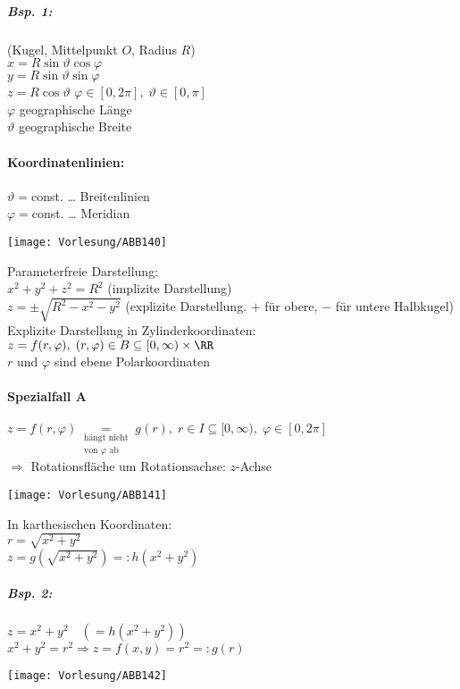 \subparagraph{Bsp. 1:} (Kugel, Mittelpunkt $O$, Radius $R$)\\
$x= R \sin \vartheta \cos \varphi$\\
$y=R \sin \vartheta \sin \varphi$\\
$z = R \cos \vartheta$ \qquad $\varphi \in [0,2\pi], \; \vartheta \in [0,\pi]$\\
$\varphi$ geographische Länge\\
$\vartheta$ geographische Breite
\paragraph{Koordinatenlinien:}\parskp
$\vartheta =$const. … Breitenlinien\\
$\varphi =$const. … Meridian
\begin{center}
\texttt{[image: Vorlesung/ABB140]}
\end{center}
Parameterfreie Darstellung:\\
$x^2+y^2+z^2=R^2$ (implizite Darstellung)\\
$z=\pm\sqrt{R^2-x^2-y^2}$ (explizite Darstellung. $+$ für obere, $-$ für untere Halbkugel)\\
Explizite Darstellung in Zylinderkoordinaten:\\
$z=f(r,\varphi), \; (r,\varphi) \in B \subseteq [0,\infty) \times \RR$\\
$r$ und $\varphi$ sind ebene Polarkoordinaten
\paragraph{Spezialfall A} $z=f(r,\varphi)\underset{\substack{\text{hängt nicht}\\\text{von }\varphi\text{ ab}}}{=} g(r), \; r\in I\subseteq [0,\infty), \; \varphi \in [0,2\pi]$\\
$\Rightarrow$ Rotationsfläche um Rotationsachse: $z$-Achse
\begin{center}
\texttt{[image: Vorlesung/ABB141]}
\end{center}
In karthesischen Koordinaten:\\
$r=\sqrt{x^2+y^2}$\\
$z=g\left(\sqrt{x^2+y^2}\right) =: h(x^2+y^2)$
\subparagraph{Bsp. 2:} $z=x^2+y^2 \quad (=h(x^2+y^2))$\\
$x^2+y^2=r^2\Rightarrow z = f(x,y) = r^2 =: g(r)$
\begin{center}
\texttt{[image: Vorlesung/ABB142]}
\end{center}
